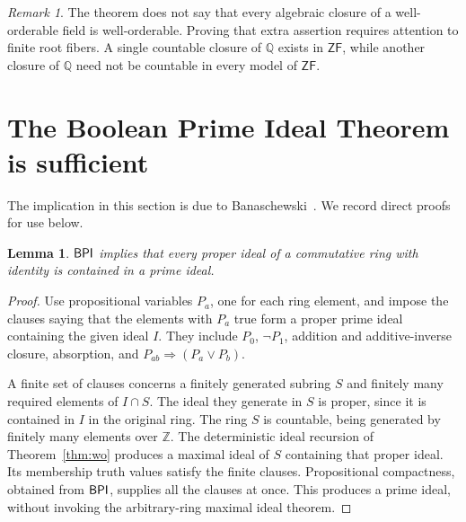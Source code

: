 \documentclass[11pt,a4paper]{article}
\newtheorem{lemma}[theorem]{Lemma}
\theoremstyle{definition}\newtheorem{definition}[theorem]{Definition}
\theoremstyle{remark}\newtheorem{remark}[theorem]{Remark}
\newcommand{\ZF}{\mathsf{ZF}}\newcommand{\ZFA}{\mathsf{ZFA}}
\newcommand{\Q}{\mathbb Q}\newcommand{\F}{\mathbb F}
\begin{document}
\begin{remark}
The theorem does not say that every algebraic closure of a well-orderable field is well-orderable. Proving that extra assertion requires attention to finite root fibers. A single countable closure of $\Q$ exists in $\ZF$, while another closure of $\Q$ need not be countable in every model of $\ZF$.
\end{remark}

\section{The Boolean Prime Ideal Theorem is sufficient}
The implication in this section is due to Banaschewski~\cite{Banaschewski}. We record direct proofs for use below.

\begin{lemma}\label{lem:ringprime}
$\mathsf{BPI}$ implies that every proper ideal of a commutative ring with identity is contained in a prime ideal.
\end{lemma}
\begin{proof}
Use propositional variables $P_a$, one for each ring element, and impose the clauses saying that the elements with $P_a$ true form a proper prime ideal containing the given ideal $I$. They include $P_0$, $\neg P_1$, addition and additive-inverse closure, absorption, and $P_{ab}\Rightarrow(P_a\vee P_b)$.

A finite set of clauses concerns a finitely generated subring $S$ and finitely many required elements of $I\cap S$. The ideal they generate in $S$ is proper, since it is contained in $I$ in the original ring. The ring $S$ is countable, being generated by finitely many elements over $\mathbb Z$. The deterministic ideal recursion of Theorem~\ref{thm:wo} produces a maximal ideal of $S$ containing that proper ideal. Its membership truth values satisfy the finite clauses. Propositional compactness, obtained from $\mathsf{BPI}$, supplies all the clauses at once. This produces a prime ideal, without invoking the arbitrary-ring maximal ideal theorem.
\end{proof}
\end{document}
